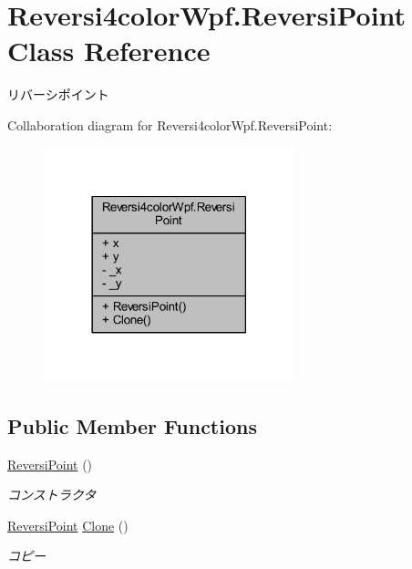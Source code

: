 \hypertarget{class_reversi4color_wpf_1_1_reversi_point}{}\section{Reversi4color\+Wpf.\+Reversi\+Point Class Reference}
\label{class_reversi4color_wpf_1_1_reversi_point}


リバーシポイント  




Collaboration diagram for Reversi4color\+Wpf.\+Reversi\+Point\+:
\nopagebreak
\begin{figure}[H]
\begin{center}
\leavevmode
\includegraphics[width=206pt]{class_reversi4color_wpf_1_1_reversi_point__coll__graph}
\end{center}
\end{figure}
\subsection*{Public Member Functions}
\begin{DoxyCompactItemize}
\item 
\hyperlink{class_reversi4color_wpf_1_1_reversi_point_a822291b557aaa185521717e47621bcdd}{Reversi\+Point} ()
\begin{DoxyCompactList}\small\item\em コンストラクタ \end{DoxyCompactList}\item 
\hyperlink{class_reversi4color_wpf_1_1_reversi_point}{Reversi\+Point} \hyperlink{class_reversi4color_wpf_1_1_reversi_point_a2c8e58a48a5199c8ccf3ca72e5517de9}{Clone} ()
\begin{DoxyCompactList}\small\item\em コピー \end{DoxyCompactList}\end{DoxyCompactItemize}

